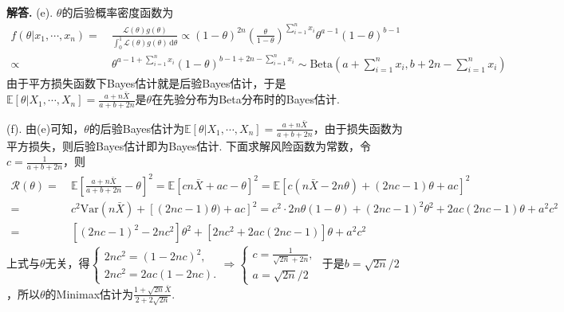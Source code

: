 \documentclass[12pt, a4paper, oneside]{ctexart}
\newenvironment{solution}[1][]{\par\noindent\textbf{#1解答. }}{\smallskip\par}  %
\def\E{\mathbb{E}}          %
\def\var{\text{Var}}        %
\def\d{\mathrm{d}}          %
\def\L{\mathcal{L}}         %
\begin{document}
\begin{solution}
    (e). $\theta$的后验概率密度函数为
    \begin{align*}
        f(\theta|x_1,\cdots,x_n)=&\ \frac{\L(\theta)g(\theta)}{\int_0^1\L(\theta)g(\theta)\,\d \theta}\propto (1-\theta)^{2n}\left(\frac{\theta}{1-\theta}\right)^{\sum\limits_{i=1}^nx_i}\theta^{a-1}(1-\theta)^{b-1}\\
        \propto&\ \theta^{a-1+\sum\limits_{i=1}^nx_i}(1-\theta)^{b-1+2n-\sum\limits_{i=1}^nx_i}\sim \text{Beta}\left(a+\sum_{i=1}^nx_i,b+2n-\sum_{i=1}^nx_i\right)
    \end{align*}
    由于平方损失函数下Bayes估计就是后验Bayes估计，于是$\E[\theta|X_1,\cdots,X_n]=\frac{a+n\bar{X}}{a+b+2n}$是$\theta$在先验分布为Beta分布时的Bayes估计.

    (f). 由(e)可知，$\theta$的后验Bayes估计为$\E[\theta|X_1,\cdots,X_n]=\frac{a+n\bar{X}}{a+b+2n}$，由于损失函数为平方损失，则后验Bayes估计即为Bayes估计. 下面求解风险函数为常数，令$c = \frac{1}{a+b+2n}$，则
    \begin{align*}
        \mathcal{R}(\theta) =&\ \E\left[\frac{a+n\bar{X}}{a+b+2n}-\theta\right]^2 = \E\left[cn\bar{X}+ac-\theta\right]^2 = \E\left[c(n\bar{X}-2n\theta)+(2nc-1)\theta+ac\right]^2\\
        =&\ c^2\var(n\bar{X}) + [(2nc-1)\theta)+ac]^2 = c^2\cdot 2n\theta(1-\theta)+(2nc-1)^2\theta^2+2ac(2nc-1)\theta+a^2c^2\\
        =&\ [(2nc-1)^2-2nc^2]\theta^2+[2nc^2+2ac(2nc-1)]\theta+a^2c^2
    \end{align*}
    上式与$\theta$无关，得$\begin{cases}
        2nc^2=(1-2nc)^2,\\
        2nc^2=2ac(1-2nc).
    \end{cases}\Rightarrow \begin{cases}
        c = \frac{1}{\sqrt{2n}+2n},\\
        a = \sqrt{2n}/2
    \end{cases}$
    于是$b = \sqrt{2n}/2$，所以$\theta$的Minimax估计为$\frac{1+\sqrt{2n}\bar{X}}{2+2\sqrt{2n}}$.
\end{solution}
\end{document}
